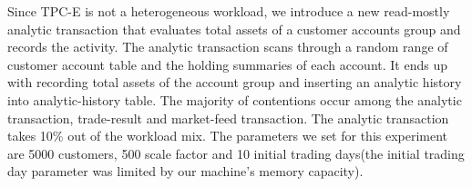 Since TPC-E is not a heterogeneous workload, we introduce a new read-mostly analytic transaction that evaluates total assets of a customer accounts group and records the activity. The analytic transaction scans through a random range of customer account table and the holding summaries of each account. It ends up with recording total assets of the account group and inserting an analytic history into analytic-history table.
The majority of contentions occur among the analytic transaction, trade-result and market-feed transaction. The analytic transaction takes 10\% out of the workload mix. %
The parameters we set for this experiment are 5000 customers, 500 scale factor and 10 initial trading days(the initial trading day parameter was limited by our machine's memory capacity). %


